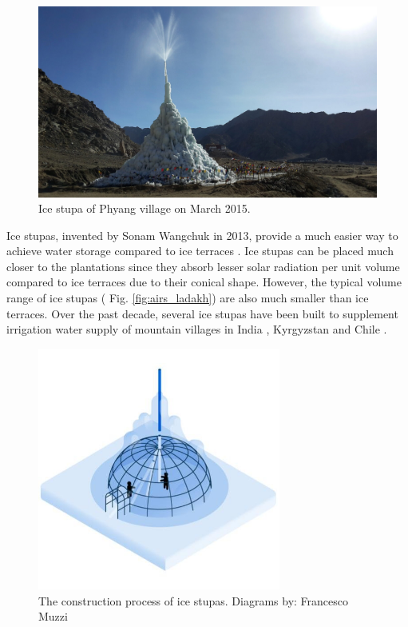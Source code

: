 \begin{figure}[htb]
\centering
\includegraphics[width=\textwidth]{figs/IS_example.jpg}
\caption{Ice stupa of Phyang village on March 2015.}
\label{fig:ISexample}
\end{figure}

Ice stupas, invented by Sonam Wangchuk in 2013, provide a much easier way to achieve water storage compared to
ice terraces \citep{wangchukIceStupaArtificial2014}. Ice stupas can be placed much closer to the
plantations since they absorb lesser solar radiation per unit volume compared to ice terraces due to their
conical shape. However, the typical volume range of ice stupas ( Fig. \ref{fig:airs_ladakh}) are also much
smaller than ice terraces. Over the past decade, several ice stupas have been built to supplement irrigation
water supply of mountain villages in India \citep{wangchukIceStupaCompetition2020, palmerStoringFrozenWater2022,
aggarwalAdaptationClimateChange2021}, Kyrgyzstan \citep{bbcnewsBrightArtificialGlacier2020} and Chile
\citep{reutersConservationistsChileAim2021}.


\begin{figure}[htb]
\centering
\includegraphics[width=8cm]{figs/IS_science.jpg}
\caption{The construction process of ice stupas. Diagrams by: Francesco Muzzi }
\label{fig:ISconstruction}
\end{figure}


